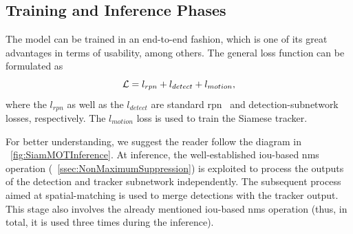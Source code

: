 \subsection{Training and Inference Phases}

The \siammot{} model can be trained in an end-to-end fashion, which is one of its great advantages in terms of usability, among others. The general loss function can be formulated as
\begin{equation}
    \label{eq:SiamMOTGeneralLoss}
    \mathcal{L} = l_{rpn} + l_{detect} + l_{motion},
\end{equation}
where the $l_{rpn}$ as well as the $l_{detect}$ are standard \gls{rpn}~\cite{ren2017fasterrcnn} and detection-subnetwork~\cite{girshick2015fast} losses, respectively. The $l_{motion}$ loss is used to train the Siamese tracker.

For better understanding, we suggest the reader follow the diagram in \figtext{}~\ref{fig:SiamMOTInference}. At inference, the well-established \gls{iou}-based \gls{nms} operation (\sectiontext{}~\ref{ssec:NonMaximumSuppression}) is exploited to process the outputs of the detection and tracker subnetwork independently. The subsequent process aimed at spatial-matching is used to merge detections with the tracker output. This stage also involves the already mentioned \gls{iou}-based \gls{nms} operation (thus, in total, it is used three times during the inference).

